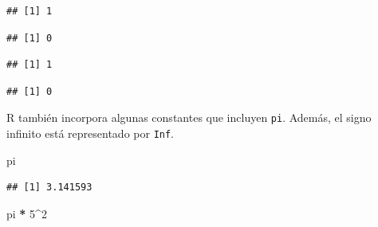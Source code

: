 \documentclass[]{book}
\newenvironment{Shaded}{\begin{snugshade}}{\end{snugshade}}
\newcommand{\DecValTok}[1]{\textcolor[rgb]{0.00,0.00,0.81}{#1}}
\newcommand{\StringTok}[1]{\textcolor[rgb]{0.31,0.60,0.02}{#1}}
\newcommand{\OperatorTok}[1]{\textcolor[rgb]{0.81,0.36,0.00}{\textbf{#1}}}
\newcommand{\NormalTok}[1]{#1}
\begin{document}
\begin{verbatim}
## [1] 1
\end{verbatim}

\begin{Shaded}
\end{Shaded}

\begin{verbatim}
## [1] 0
\end{verbatim}

\begin{Shaded}
\end{Shaded}

\begin{verbatim}
## [1] 1
\end{verbatim}

\begin{Shaded}
\end{Shaded}

\begin{verbatim}
## [1] 0
\end{verbatim}

R también incorpora algunas constantes que incluyen \texttt{pi}. Además,
el signo infinito está representado por \texttt{Inf}.

\begin{Shaded}
\begin{Highlighting}[]
\NormalTok{pi}
\end{Highlighting}
\end{Shaded}

\begin{verbatim}
## [1] 3.141593
\end{verbatim}

\begin{Shaded}
\begin{Highlighting}[]
\NormalTok{pi }\OperatorTok{*}\StringTok{ }\DecValTok{5}\OperatorTok{^}\DecValTok{2}
\end{Highlighting}
\end{Shaded}
\end{document}
